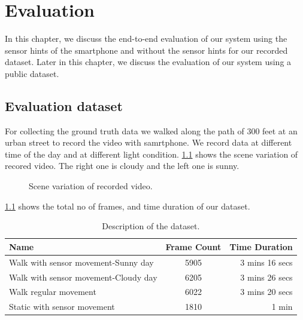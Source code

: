 \chapter{Evaluation}
\label{c:evalu}

In this chapter, we discuss the end-to-end evaluation of our system using the sensor hints of the smartphone and without the sensor hints for our recorded dataset.
Later in this chapter, we discuss the evaluation of our system using a public dataset.

\section{Evaluation dataset}
\label{s:eval}
For collecting the ground truth data we walked along the path of 300 feet at an urban street to record the video with samrtphone.
We record data at different time of the day and at different light condition.
\ref{f:dataset} shows the scene variation of recored video.
The right one is cloudy and the left one is sunny.

\begin{figure}[!ht]
\centering
{}
\hfill
{}
\caption{Scene variation of recorded video.}
\label{f:dataset}
\end{figure}

\ref{t:dataset} shows the total no of frames, and time duration of our dataset.

\begin{table}[h!]
  \centering
  \caption{Description of the dataset.}
  \label{t:dataset}
  \begin{tabular}{  l  c  r  }
   
    Name & Frame Count & Time Duration \\
    \hline
    Walk with sensor movement-Sunny day & 5905 & 3 mins 16 secs  \\
    Walk with sensor movement-Cloudy day & 6205 & 3 mins 26 secs \\
    Walk regular movement & 6022 & 3 mins 20 secs \\
    Static with sensor movement & 1810 & 1 min \\
    \hline
  \end{tabular}
\end{table}

